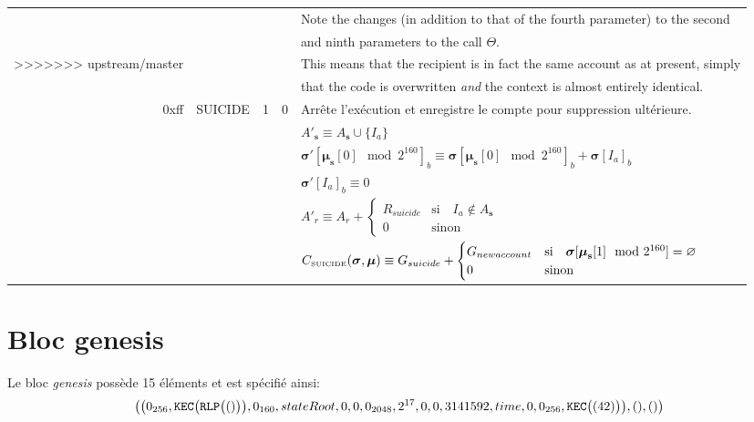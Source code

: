 \documentclass[9pt,oneside]{amsart}
\begin{document}
\begin{tabular*}{\columnwidth}[h]{rlrrl}
&&&& Note the changes (in addition to that of the fourth parameter) to the second \\
&&&& and ninth parameters to the call $\Theta$.\\
>>>>>>> upstream/master
&&&& This means that the recipient is in fact the same account as at present, simply\\
&&&& that the code is overwritten {\it and} the context is almost entirely identical.\\
\midrule
0xff & {\small SUICIDE} & 1 & 0 & Arrête l'exécution et enregistre le compte pour suppression ultérieure. \\
&&&& $A'_\mathbf{s} \equiv A_\mathbf{s} \cup \{ I_a \}$ \\
&&&& $\boldsymbol{\sigma}'[\boldsymbol{\mu}_\mathbf{s}[0] \mod 2^{160}]_b \equiv \boldsymbol{\sigma}[\boldsymbol{\mu}_\mathbf{s}[0] \mod 2^{160}]_b + \boldsymbol{\sigma}[I_a]_b$ \\
&&&& $\boldsymbol{\sigma}'[I_a]_b \equiv 0$ \\
&&&& $A'_{r} \equiv A_{r} + \begin{cases}
R_{suicide} & \text{si} \quad I_a \notin A_\mathbf{s} \\
0 & \text{sinon}
\end{cases}$ \\
&&&& $C_{\text{\tiny SUICIDE}}(\boldsymbol{\sigma}, \boldsymbol{\mu}) \equiv G_{suicide} + \begin{cases}
G_{newaccount} & \text{si} \quad \boldsymbol{\sigma}[\boldsymbol{\mu}_\mathbf{s}[1] \mod 2^{160}] = \varnothing \\
0 & \text{sinon}
\end{cases}$ \\
\bottomrule
\end{tabular*}


\section{Bloc genesis}\label{app:genesis}

Le bloc \textit{genesis} possède 15 éléments et est spécifié ainsi:
\begin{equation}
\big( \big( 0_{256}, \mathtt{\tiny KEC}\big(\mathtt{\tiny RLP}\big( () \big)\big), 0_{160}, stateRoot, 0, 0, 0_{2048}, 2^{17}, 0, 0, 3141592, time, 0, 0_{256},  \mathtt{\tiny KEC}\big( (42) \big) \big), (), () \big)
\end{equation}
\end{document}

